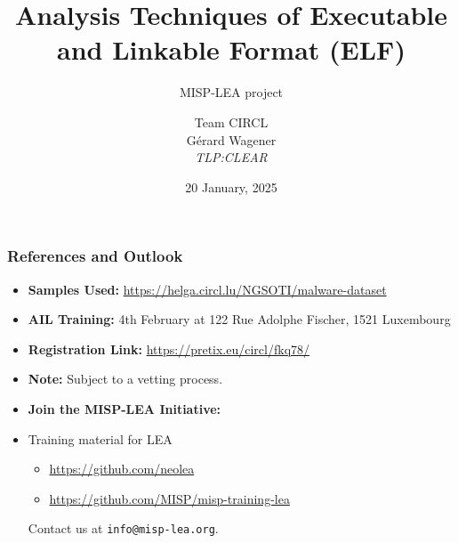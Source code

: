 \documentclass{beamer}
\author{\small{Team CIRCL\\G{\'e}rard Wagener \\ \emph{TLP:CLEAR}}}
\title{Analysis Techniques of Executable and Linkable Format (ELF)}
\subtitle{MISP-LEA project}
\institute{\href{https://www.circl.lu}{https://www.circl.lu} \\}
\date{20 January, 2025}
\begin{document}
\begin{frame}
    \maketitle
\end{frame}







%

\begin{frame}
    \frametitle{References and Outlook}
    \begin{itemize}
        \item \textbf{Samples Used:}
        \url{https://helga.circl.lu/NGSOTI/malware-dataset}
        \item \textbf{AIL Training:}
        4th February at 122 Rue Adolphe Fischer, 1521 Luxembourg
        \item \textbf{Registration Link:}
        \url{https://pretix.eu/circl/fkq78/}
        \item \textbf{Note:} Subject to a vetting process.
        \item \textbf{Join the MISP-LEA Initiative:}
        \item Training material for LEA
        \begin{itemize}
            \item \url{https://github.com/neolea}
            \item \url{https://github.com/MISP/misp-training-lea}
        \end{itemize}
        Contact us at \texttt{info@misp-lea.org}.
    \end{itemize}
\end{frame}
\end{document}
